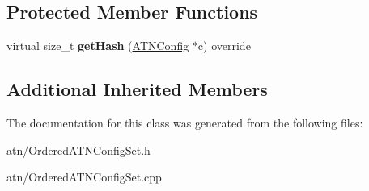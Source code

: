 \subsection*{Protected Member Functions}
\begin{DoxyCompactItemize}
\item 
\mbox{\label{classantlr4_1_1atn_1_1OrderedATNConfigSet_a598e9582e6f59e7a07429c4fdc8ef125}} 
virtual size\+\_\+t {\bfseries get\+Hash} (\hyperlink{classantlr4_1_1atn_1_1ATNConfig}{A\+T\+N\+Config} $\ast$c) override
\end{DoxyCompactItemize}
\subsection*{Additional Inherited Members}


The documentation for this class was generated from the following files\+:\begin{DoxyCompactItemize}
\item 
atn/Ordered\+A\+T\+N\+Config\+Set.\+h\item 
atn/Ordered\+A\+T\+N\+Config\+Set.\+cpp\end{DoxyCompactItemize}
